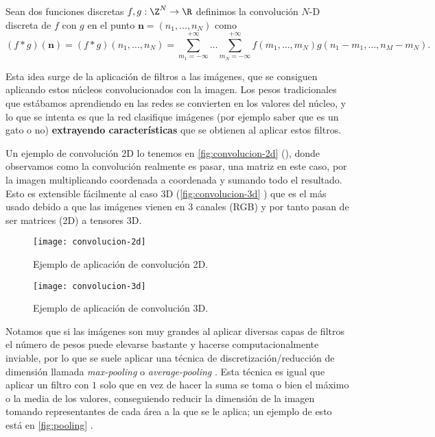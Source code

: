 \begin{definicion}
  Sean dos funciones discretas $f, g : \Z^N \to \R$ definimos la convolución $N$-D discreta de $f$ con $g$ en el punto $\textbf{n} = (n_1, \ldots, n_N)$ como
  $$(f * g)(\textbf{n}) = (f * g)(n_1, \ldots, n_N) = \sum \limits^{+\infty}_{m_1 = -\infty} \ldots \sum^{+\infty}_{m_N = -\infty} f(m_1, \ldots, m_N)g(n_1 - m_1, \ldots, n_M - m_N).$$
  \label{def:convolucion}
\end{definicion}

Esta idea surge de la aplicación de filtros a las imágenes, que se consiguen aplicando estos núcleos convolucionados con la imagen. Los pesos tradicionales que estábamos aprendiendo en las redes se convierten en los valores del núcleo, y lo que se intenta es que la red clasifique imágenes (por ejemplo saber que es un gato o no) \textbf{extrayendo características} que se obtienen al aplicar estos filtros.

Un ejemplo de convolución 2D lo tenemos en \autoref{fig:convolucion-2d} (\cite{pelatrion2020conv}), donde observamos como la convolución realmente es pasar, una matriz en este caso, por la imagen multiplicando coordenada a coordenada y sumando todo el resultado. Esto es extensible fácilmente al caso 3D (\autoref{fig:convolucion-3d} \cite{bansal2018conv}) que es el más usado debido a que las imágenes vienen en 3 canales (RGB) y por tanto pasan de ser matrices (2D) a tensores 3D.

\begin{figure}[htpb]
  \centering
  \texttt{[image: convolucion-2d]}
  \caption{Ejemplo de aplicación de convolución 2D.}
  \label{fig:convolucion-2d}
\end{figure}

\begin{figure}[htpb]
  \centering
  \texttt{[image: convolucion-3d]}
  \caption{Ejemplo de aplicación de convolución 3D.}
  \label{fig:convolucion-3d}
\end{figure}

Notamos que si las imágenes son muy grandes al aplicar diversas capas de filtros el número de pesos puede elevarse bastante y hacerse computacionalmente inviable, por lo que se suele aplicar una técnica de discretización/reducción de dimensión llamada \emph{max-pooling} o \emph{average-pooling }\cite{graham2014fractional}. Esta técnica es igual que aplicar un filtro con $1$ solo que en vez de hacer la suma se toma o bien el máximo o la media de los valores, conseguiendo reducir la dimensión de la imagen tomando representantes de cada área a la que se le aplica; un ejemplo de esto está en \autoref{fig:pooling} \cite{yani2019application}.

